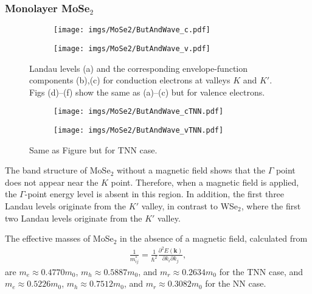 \documentclass{article}
\begin{document}
\newpage
\subsubsection*{Monolayer MoSe$_{2}$}
\begin{figure}[htb]
	\begin{subfigure}{0.495\textwidth}
		\centering
		\texttt{[image: imgs/MoSe2/ButAndWave\_c.pdf]}
	\end{subfigure}
	\begin{subfigure}{0.495\textwidth}
		\centering
		\texttt{[image: imgs/MoSe2/ButAndWave\_v.pdf]}
	\end{subfigure}
	\caption{Landau levels (a) and the corresponding envelope-function components (b),(c) for conduction electrons at valleys $K$ and $K'$. Figs (d)–(f) show the same as (a)–(c) but for valence electrons.}
\end{figure}

\begin{figure}[!h]
	\begin{subfigure}{0.495\textwidth}
		\centering
		\texttt{[image: imgs/MoSe2/ButAndWave\_cTNN.pdf]}
	\end{subfigure}
	\begin{subfigure}{0.495\textwidth}
		\centering
		\texttt{[image: imgs/MoSe2/ButAndWave\_vTNN.pdf]}
	\end{subfigure}
	\caption{Same as Figure but for TNN case.}
\end{figure}

The band structure of MoSe$_{2}$ without a magnetic field shows that the $\Gamma$ point does not appear near the $K$ point. Therefore, when a magnetic field is applied, the $\Gamma$-point energy level is absent in this region. In addition, the first three Landau levels originate from the $K'$ valley, in contrast to WSe$_{2}$, where the first two Landau levels originate from the $K'$ valley.

The effective masses of MoSe$_{2}$ in the absence of a magnetic field, calculated from
\begin{gather}
	\frac{1}{m_{ij}^{*}} = \frac{1}{\hbar^{2}} \frac{\partial^{2} E(\mathbf{k})}{\partial k_{i}\partial k_{j}},
\end{gather}
are $m_{e} \approx 0.4770 m_{0}$, $m_{h} \approx 0.5887 m_{0}$, and $m_{r} \approx 0.2634 m_{0}$ for the TNN case, and $m_{e} \approx 0.5226 m_{0}$, $m_{h} \approx 0.7512 m_{0}$, and $m_{r} \approx 0.3082 m_{0}$ for the NN case.
\end{document}
